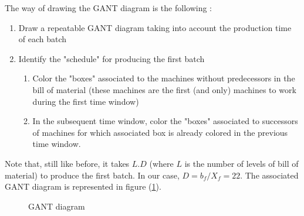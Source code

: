 The way of drawing the GANT diagram is the following : 
\begin{enumerate}
    \item Draw a repeatable GANT diagram taking into account the production time of each batch
    \item Identify the "schedule" for producing the first batch
    \begin{enumerate}
        \item Color the "boxes" associated to the machines without predecessors in the bill of material (these machines are the first (and only) machines to work during the first time window)
        \item In the subsequent time window, color the "boxes" associated to successors of machines for which associated box is already colored in the previous time window.
    \end{enumerate}
\end{enumerate}

Note that, still like before, it takes $L.D$ (where $L$ is the number of levels of bill of material) to produce the first batch. In our case, $D=b_f/X_f=22$. The associated GANT diagram is represented in figure (\ref{shared_temp:gant}).

\begin{figure}
    \caption{\label{shared_temp:gant}GANT diagram}
\end{figure}
